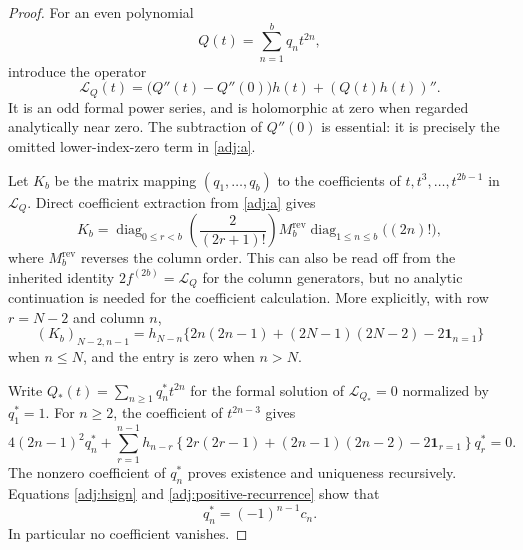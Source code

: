 \begin{proof}
For an even polynomial
\[
 Q(t)=\sum_{n=1}^{b}q_n t^{2n},
\]
introduce the operator
\begin{equation}\label{adj:operator}
 \mathcal L_Q(t)=\bigl(Q''(t)-Q''(0)\bigr)h(t)+(Q(t)h(t))''.
\end{equation}
It is an odd formal power series, and is holomorphic at zero when
regarded analytically near zero.  The subtraction of $Q''(0)$ is
essential: it is precisely the omitted lower-index-zero term in
\eqref{adj:a}.

Let $K_b$ be the matrix mapping $(q_1,\ldots,q_b)$ to the
coefficients of $t,t^3,\ldots,t^{2b-1}$ in $\mathcal L_Q$.
Direct coefficient extraction from \eqref{adj:a} gives
\begin{equation}\label{adj:matrix-conjugacy}
 K_b=\operatorname{diag}_{0\le r<b}\left(\frac2{(2r+1)!}\right)
 M_b^{\mathrm{rev}}
 \operatorname{diag}_{1\le n\le b}\bigl((2n)!\bigr),
\end{equation}
where $M_b^{\mathrm{rev}}$ reverses the column order.  This can
also be read off from the inherited identity
$2f^{(2b)}=\mathcal L_Q$ for the column generators, but no
analytic continuation is needed for the coefficient calculation.
More explicitly, with row $r=N-2$ and column $n$,
\[
 (K_b)_{N-2,n-1}
 =h_{N-n}\{2n(2n-1)+(2N-1)(2N-2)-2\mathbf1_{n=1}\}
\]
when $n\le N$, and the entry is zero when $n>N$.

Write $Q_*(t)=\sum_{n\ge1}q_n^*t^{2n}$ for the formal solution
of $\mathcal L_{Q_*}=0$ normalized by $q_1^*=1$.  For $n\ge2$,
the coefficient of $t^{2n-3}$ gives
\begin{equation}\label{adj:q-recurrence}
 4(2n-1)^2q_n^*
 +\sum_{r=1}^{n-1}h_{n-r}
 \left\{2r(2r-1)+(2n-1)(2n-2)-2\mathbf1_{r=1}\right\}q_r^*=0.
\end{equation}
The nonzero coefficient of $q_n^*$ proves existence and uniqueness
recursively.  Equations \eqref{adj:hsign} and
\eqref{adj:positive-recurrence} show that
\begin{equation}\label{adj:qsign}
 q_n^*=(-1)^{n-1}c_n.
\end{equation}
In particular no coefficient vanishes.


\end{proof}
